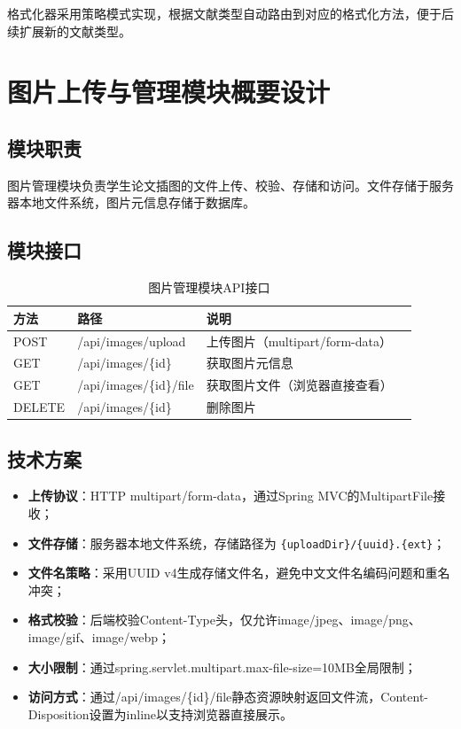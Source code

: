 \documentclass{../softeng}
\begin{document}
格式化器采用策略模式实现，根据文献类型自动路由到对应的格式化方法，便于后续扩展新的文献类型。

\section{图片上传与管理模块概要设计}

\subsection{模块职责}

图片管理模块负责学生论文插图的文件上传、校验、存储和访问。文件存储于服务器本地文件系统，图片元信息存储于数据库。

\subsection{模块接口}

\begin{table}[htbp]
\centering
\caption{图片管理模块API接口}
\label{tab:img_api}
\begin{tabular}{lllp{5cm}}
\toprule
\textbf{方法} & \textbf{路径} & \textbf{说明} \\
\midrule
POST   & /api/images/upload       & 上传图片（multipart/form-data） \\
GET    & /api/images/\{id\}        & 获取图片元信息 \\
GET    & /api/images/\{id\}/file   & 获取图片文件（浏览器直接查看） \\
DELETE & /api/images/\{id\}        & 删除图片 \\
\bottomrule
\end{tabular}
\end{table}

\subsection{技术方案}

\begin{itemize}
    \item \textbf{上传协议}：HTTP multipart/form-data，通过Spring MVC的MultipartFile接收；
    \item \textbf{文件存储}：服务器本地文件系统，存储路径为 \verb|{uploadDir}/{uuid}.{ext}|；
    \item \textbf{文件名策略}：采用UUID v4生成存储文件名，避免中文文件名编码问题和重名冲突；
    \item \textbf{格式校验}：后端校验Content-Type头，仅允许image/jpeg、image/png、image/gif、image/webp；
    \item \textbf{大小限制}：通过spring.servlet.multipart.max-file-size=10MB全局限制；
    \item \textbf{访问方式}：通过/api/images/\{id\}/file静态资源映射返回文件流，Content-Disposition设置为inline以支持浏览器直接展示。
\end{itemize}
\end{document}
